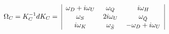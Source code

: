 \begin{equation}\label{CN2}
\begin{tabular}{c|ccc|c}
  &$ \omega_D+i\omega_U  $&$\omega_Q$&$i\omega_H$&\\
$\!\!\!\!\!\Omega_C=K_C^{-1}dK_C=$&$\omega_S$&$2i\omega_U$&$\omega_{\bar Q}$&\\
  & $i\omega_K$&$\omega_{\bar S}$&$- \omega_D+i\omega_U  $&\\
\end{tabular}\\
\end{equation}


